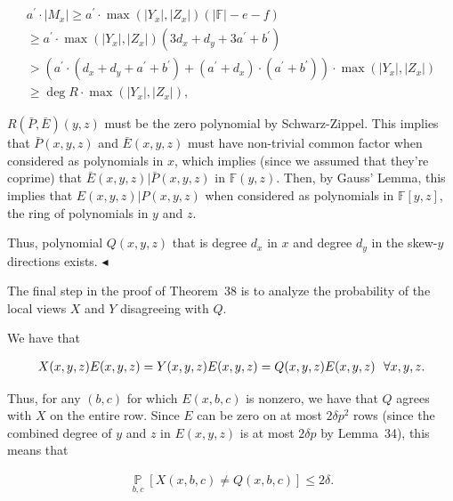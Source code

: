 \[\begin{gathered}
\displaystyle a^{\prime}\cdot|M_{x}| \displaystyle\geq a^{\prime}\cdot\max(|Y_{x}|,|Z_{x}|)(|\mathbb{F}|-e-f) \\
\displaystyle\geq a^{\prime}\cdot\max(|Y_{x}|,|Z_{x}|)(3d_{x}+d_{y}+3a^{\prime}+b^{\prime}) \\
\displaystyle>\left(a^{\prime}\cdot(d_{x}+d_{y}+a^{\prime}+b^{\prime})+(a^{\prime}+d_{x})\cdot(a^{\prime}+b^{\prime})\right)\cdot\max(|Y_{x}|,|Z_{x}|) \\
\displaystyle\geq\deg R\cdot\max(|Y_{x}|,|Z_{x}|),
\end{gathered}\]


$R(\bar{P},\bar{E})(y,z)$ must be the zero polynomial by Schwarz-Zippel. This implies that $\bar{P}(x,y,z)$ and $\bar{E}(x,y,z)$ must have non-trivial common factor when considered as polynomials in $x$, which implies (since we assumed that they’re coprime) that $\bar{E}(x,y,z)|\bar{P}(x,y,z)$ in $\mathbb{F}(y,z)$. Then, by Gauss’ Lemma, this implies that $E(x,y,z)|P(x,y,z)$ when considered as polynomials in $\mathbb{F}[y,z]$, the ring of polynomials in $y$ and $z$.\par




Thus, polynomial $Q(x,y,z)$ that is degree $d_{x}$ in $x$ and degree $d_{y}$ in the skew-$y$ directions exists.
$\blacktriangleleft$\par




The final step in the proof of Theorem 38 is to analyze the probability of the local views $X$ and $Y$ disagreeing with $Q$.\par




We have that\par


\[\begin{gathered}
X(x,y,z)E(x,y,z)=Y(x,y,z)E(x,y,z)=Q(x,y,z)E(x,y,z)\nobreak\ \nobreak\ \forall x,y,z.
\end{gathered}\]


Thus, for any $(b,c)$ for which $E(x,b,c)$ is nonzero, we have that $Q$ agrees with $X$ on the entire row. Since $E$ can be zero on at most $2\delta p^{2}$ rows (since the combined degree of $y$ and $z$ in $E(x,y,z)$ is at most $2\delta p$ by Lemma 34), this means that\par


\[\begin{gathered}
\operatorname*{\mathbb{P}}_{b,c}[X(x,b,c)\not=Q(x,b,c)]\leq 2\delta.
\end{gathered}\]


